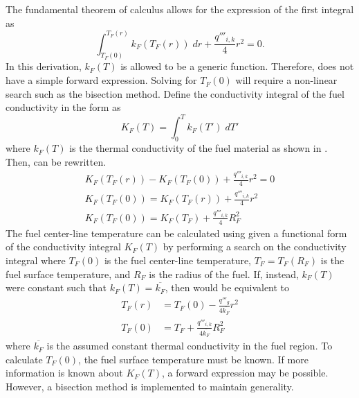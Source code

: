       The fundamental theorem of calculus allows for the expression of the first
      integral as
      \begin{equation}
        \label{eq:tcl_integral}
        \int_{T_F(0)}^{T_F(r)} k_F(T_F(r)) \; dr + \frac{q'''_{i,k}}{4} r^2 = 0.
      \end{equation}
      In this derivation, $k_F(T)$ is allowed to be a generic function. 
      Therefore,  does not have a simple forward 
      expression. Solving for $T_F(0)$ will require a non-linear search such as
      the bisection method. Define the conductivity integral of the fuel
      conductivity in the form as
      \begin{equation}
        \label{eq:conductivity_integral}
        K_F(T) = \int_0^T k_F(T') \; dT'
      \end{equation}
      where $k_F(T)$ is the thermal conductivity of the fuel material as shown
      in . Then,  can be rewritten.
      \begin{gather}
        K_F(T_F(r)) - K_F(T_F(0)) + \frac{q'''_{i,k}}{4} r^2 = 0 \\
        \label{eq:tfuel_r}
        K_F(T_F(0)) = K_F(T_F(r)) + \frac{q'''_{i,k}}{4} r^2 \\
        \label{eq:tcl_conductivity_integral}
        K_F(T_F(0)) = K_F(T_F) + \frac{q'''_{i,k}}{4} R_F^2
      \end{gather}
      The fuel center-line temperature can be calculated using
       given a functional form of the
      conductivity integral $K_F(T)$ by performing a search on the conductivity
      integral where $T_F(0)$ is the fuel center-line temperature, 
      $T_F=T_F(R_F)$ is the fuel surface temperature, and $R_F$ is the radius of 
      the fuel. If, instead, $k_F(T)$ were constant such that $k_F(T) =
      \overline{k_F}$, then  would be 
      equivalent to 
      \begin{align}
        \label{eq:tfr}
        T_F(r) &= T_F(0) - \frac{q'''_g}{4 \overline{k_F}} r^2 \\
        \label{eq:tcl_constant_kfuel}
        T_F(0) &= T_F + \frac{q'''_{i,k}}{4 \overline{k_F}} R_F^2
      \end{align}
      where $\overline{k_F}$ is the assumed constant thermal conductivity in the 
      fuel region.
      To calculate $T_F(0)$, the fuel surface temperature must be known.
      If more information is known about $K_F(T)$, a forward expression
      may be possible. However, a bisection method is implemented to maintain
      generality.


